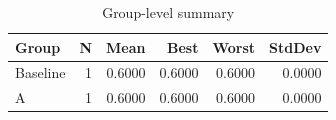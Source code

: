 \begin{table}[htbp]
\centering
\caption{Group-level summary}
\label{tab:group-summary}
\begin{tabular}{lrrrrr}
\toprule
\textbf{Group} & \textbf{N} & \textbf{Mean} & \textbf{Best} & \textbf{Worst} & \textbf{StdDev} \\
\midrule
Baseline & 1 & 0.6000 & 0.6000 & 0.6000 & 0.0000 \\
A & 1 & 0.6000 & 0.6000 & 0.6000 & 0.0000 \\
\bottomrule
\end{tabular}
\end{table}